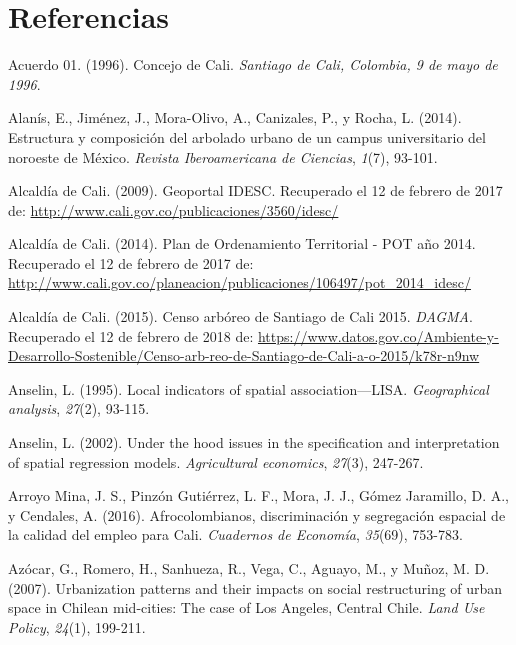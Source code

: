\documentclass[12pt,a4paper,openany]{book}
\theoremstyle{definition}
\theoremstyle{definition}
\theoremstyle{definition}
\theoremstyle{remark}
\begin{document}
\chapter*{Referencias}\label{referencias}

\hypertarget{refs}{}
\hypertarget{ref-cc_acuerdo01_1996}{}
Acuerdo 01. (1996). Concejo de Cali. \emph{Santiago de Cali, Colombia, 9
de mayo de 1996}.

\hypertarget{ref-alanis_estructura_2014}{}
Alanís, E., Jiménez, J., Mora-Olivo, A., Canizales, P., y Rocha, L.
(2014). Estructura y composición del arbolado urbano de un campus
universitario del noroeste de México. \emph{Revista Iberoamericana de
Ciencias}, \emph{1}(7), 93-101.

\hypertarget{ref-geoportal_idesc}{}
Alcaldía de Cali. (2009). Geoportal IDESC. Recuperado el 12 de febrero
de 2017 de: \url{http://www.cali.gov.co/publicaciones/3560/idesc/}

\hypertarget{ref-pot2014cali}{}
Alcaldía de Cali. (2014). Plan de Ordenamiento Territorial - POT año
2014. Recuperado el 12 de febrero de 2017 de:
\url{http://www.cali.gov.co/planeacion/publicaciones/106497/pot_2014_idesc/}

\hypertarget{ref-ca2015cali}{}
Alcaldía de Cali. (2015). Censo arbóreo de Santiago de Cali 2015.
\emph{DAGMA}. Recuperado el 12 de febrero de 2018 de:
\url{https://www.datos.gov.co/Ambiente-y-Desarrollo-Sostenible/Censo-arb-reo-de-Santiago-de-Cali-a-o-2015/k78r-n9nw}

\hypertarget{ref-anselin1995local}{}
Anselin, L. (1995). Local indicators of spatial association---LISA.
\emph{Geographical analysis}, \emph{27}(2), 93-115.

\hypertarget{ref-anselin_under_2002}{}
Anselin, L. (2002). Under the hood issues in the specification and
interpretation of spatial regression models. \emph{Agricultural
economics}, \emph{27}(3), 247-267.

\hypertarget{ref-arroyo_mina_afrocolombianos_2016}{}
Arroyo Mina, J. S., Pinzón Gutiérrez, L. F., Mora, J. J., Gómez
Jaramillo, D. A., y Cendales, A. (2016). Afrocolombianos, discriminación
y segregación espacial de la calidad del empleo para Cali.
\emph{Cuadernos de Economía}, \emph{35}(69), 753-783.

\hypertarget{ref-azocar_urbanization_2007}{}
Azócar, G., Romero, H., Sanhueza, R., Vega, C., Aguayo, M., y Muñoz, M.
D. (2007). Urbanization patterns and their impacts on social
restructuring of urban space in Chilean mid-cities: The case of Los
Angeles, Central Chile. \emph{Land Use Policy}, \emph{24}(1), 199-211.
\end{document}
